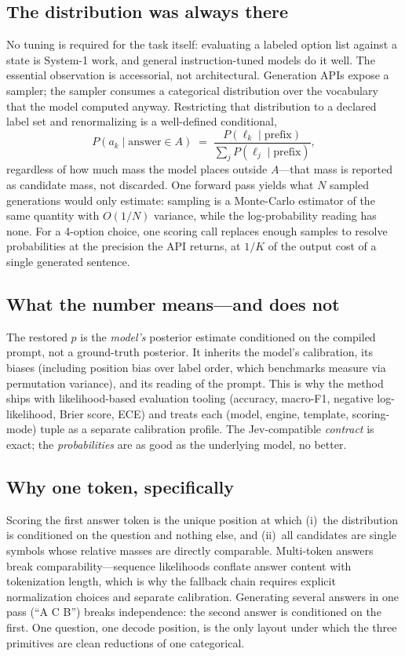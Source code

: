 \documentclass[11pt]{article}
\begin{document}
\subsection{The distribution was always there}

No tuning is required for the task itself: evaluating a labeled option
list against a state is System-1 work, and general instruction-tuned
models do it well. The essential observation is accessorial, not
architectural. Generation
APIs expose a sampler; the sampler consumes a categorical distribution
over the vocabulary that the model computed anyway. Restricting that
distribution to a declared label set and renormalizing is a well-defined
conditional,
\[
P(a_k \mid \text{answer} \in A) \;=\;
\frac{P(\ell_k \mid \text{prefix})}{\sum_{j} P(\ell_j \mid \text{prefix})},
\]
regardless of how much mass the model places outside $A$---that mass is
reported as candidate mass, not discarded. One forward pass yields what
$N$ sampled generations would only estimate: sampling is a Monte-Carlo
estimator of the same quantity with $O(1/N)$ variance, while the
log-probability reading has none. For a 4-option choice, one scoring call
replaces enough samples to resolve probabilities at the precision the API
returns, at $1/K$ of the output cost of a single generated sentence.

\subsection{What the number means---and does not}

The restored $p$ is the \emph{model's} posterior estimate conditioned on
the compiled prompt, not a ground-truth posterior. It inherits the model's
calibration, its biases (including position bias over label order, which
benchmarks measure via permutation variance), and its reading of the
prompt. This is why the method ships with likelihood-based evaluation
tooling (accuracy, macro-F1, negative log-likelihood, Brier score, ECE)
and treats each (model, engine, template, scoring-mode) tuple as a
separate calibration profile. The Jev-compatible \emph{contract} is exact;
the \emph{probabilities} are as good as the underlying model, no better.

\subsection{Why one token, specifically}

Scoring the first answer token is the unique position at which (i)~the
distribution is conditioned on the question and nothing else, and (ii)~all
candidates are single symbols whose relative masses are directly
comparable. Multi-token answers break comparability---sequence
likelihoods conflate answer content with tokenization length, which is why
the fallback chain requires explicit normalization choices and separate
calibration. Generating several answers in one pass (``A C B'') breaks
independence: the second answer is conditioned on the first. One question,
one decode position, is the only layout under which the three primitives
are clean reductions of one categorical.
\end{document}
